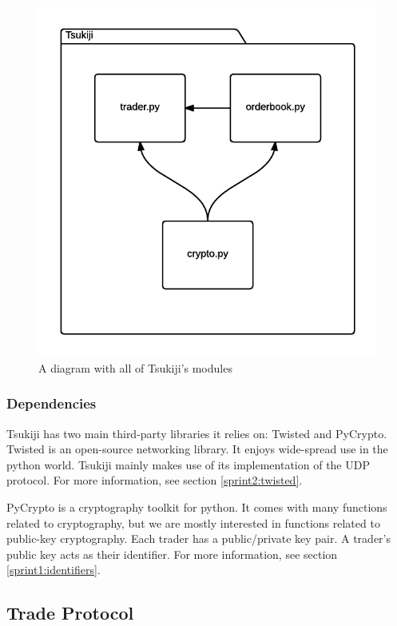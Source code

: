 \begin{figure}
  \centering
  \includegraphics[width=\textwidth]{modules}
  \caption{A diagram with all of Tsukiji's modules}
  \label{modulesfig}
\end{figure}

\subsubsection{Dependencies}
\label{dependencies}
Tsukiji has two main third-party libraries it relies on: Twisted\cite{twisted} and PyCrypto\cite{pycrypto}.
Twisted is an open-source networking library.
It enjoys wide-spread use in the python world.
Tsukiji mainly makes use of its implementation of the UDP protocol.
For more information, see section \ref{sprint2:twisted}.

PyCrypto is a cryptography toolkit for python.
It comes with many functions related to cryptography, but we are mostly interested in functions related to public-key cryptography.
Each trader has a public/private key pair.
A trader's public key acts as their identifier.
For more information, see section \ref{sprint1:identifiers}.

\subsection{Trade Protocol}
\label{protocol}

